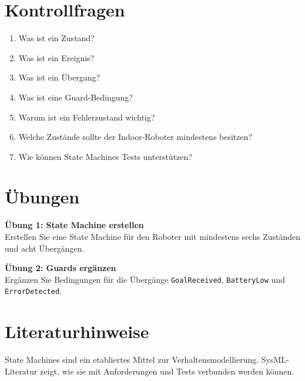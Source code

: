 \section{Kontrollfragen}
\begin{enumerate}
    \item Was ist ein Zustand?
    \item Was ist ein Ereignis?
    \item Was ist ein Übergang?
    \item Was ist eine Guard-Bedingung?
    \item Warum ist ein Fehlerzustand wichtig?
    \item Welche Zustände sollte der Indoor-Roboter mindestens besitzen?
    \item Wie können State Machines Tests unterstützen?
\end{enumerate}

\section{Übungen}
\begin{uebungbox}
\textbf{Übung 1: State Machine erstellen}\\
Erstellen Sie eine State Machine für den Roboter mit mindestens sechs Zuständen und acht Übergängen.
\end{uebungbox}

\begin{uebungbox}
\textbf{Übung 2: Guards ergänzen}\\
Ergänzen Sie Bedingungen für die Übergänge \texttt{GoalReceived}, \texttt{BatteryLow} und \texttt{ErrorDetected}.
\end{uebungbox}

\section{Literaturhinweise}
State Machines sind ein etabliertes Mittel zur Verhaltensmodellierung. SysML-Literatur \cite{delligatti2014,friedenthal2014} zeigt, wie sie mit Anforderungen und Tests verbunden werden können.
